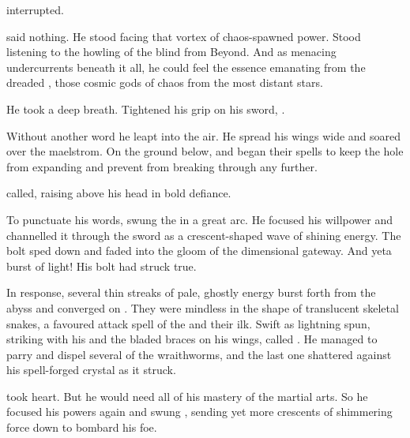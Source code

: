  \Ganethed interrupted. 

\Teshrial said nothing. 
He stood facing that vortex of chaos-spawned power.
Stood listening to the howling of the blind \daemons from Beyond. 
And as menacing undercurrents beneath it all, he could feel the essence emanating from the dreaded \xss, those cosmic gods of chaos from the most distant stars. 

He took a deep breath. 
Tightened his grip on his \senaan sword, \Turishah. 


Without another word he leapt into the air. 
He spread his wings wide and soared over the maelstrom. 
On the ground below, \Ganethed and \Achsah began their spells to keep the hole from expanding and prevent \Ishnaruchaefir from breaking through any further. 

\ta{\QuessanthIshnaruchaefir!} \Teshrial called, raising \Turishah above his head in bold defiance.

To punctuate his words, \Teshrial swung the \senaan \Turishah in a great arc. 
He focused his willpower and channelled it through the sword as a crescent-shaped wave of shining energy. 
The bolt sped down and faded into the gloom of the dimensional gateway. 
And yet\dash a burst of light!
His bolt had struck true. 

In response, several thin streaks of pale, ghostly energy burst forth from the abyss and converged on \Teshrial. 
They were mindless \daemons in the shape of translucent skeletal snakes, a favoured attack spell of the \dragons and their ilk. 
Swift as lightning \Teshrial spun, striking with his \senaan and the bladed braces on his wings, called \kilghain. 
He managed to parry and dispel several of the wraithworms, and the last one shattered against his spell-forged crystal \armour as it struck. 

\Teshrial took heart. 
But he would need all of his mastery of the martial arts. 
So he focused his powers again and swung \Turishah, sending yet more crescents of shimmering force down to bombard his foe. 

